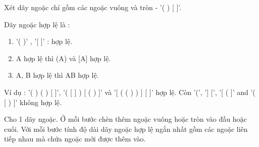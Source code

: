 Xét dãy ngoặc chỉ gồm các ngoặc vuông và tròn - '( ) [ ]'.

Dãy ngoặc hợp lệ là :
\begin{enumerate}
	\item '( )' , '[ ]' : hợp lệ.
	\item A hợp lệ thì (A) và [A] hợp lệ.
	\item A, B hợp lệ thì AB hợp lệ.
\end{enumerate}

Ví dụ : '( ) ( ) [ ]', '( [ ] ) [ ( ) ]' và '[ ( ( ) ) ] [ ]' hợp lệ. Còn '(', '] [', '[ ( ]' and '( [ ) ]' không hợp lệ.

Cho 1 dãy ngoặc. Ở mỗi bước chèn thêm ngoặc vuông hoặc tròn vào đầu hoặc cuối. Với mỗi bước tính độ dài dãy ngoặc hợp lệ ngắn nhất gồm các ngoặc liên tiếp nhau mà chứa ngoặc mới được thêm vào.

\